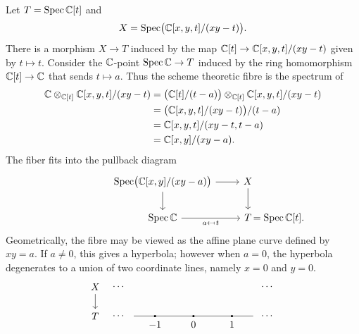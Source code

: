 \begin{example}
  Let $T = \operatorname{Spec} \mathbb{C}[t]$ and
  \[X = \operatorname{Spec}\bigl(\mathbb{C}[x, y, t]/(xy - t)\bigr).\] There is a morphism $X \to T$ induced by the map $\mathbb{C}[t] \to \mathbb{C}[x, y, t]/(xy - t)$ given by $t \mapsto t$. Consider the $\mathbb{C}$-point $\operatorname{Spec} \mathbb{C} \to T$ induced by the ring homomorphism $\mathbb{C}[t] \to \mathbb{C}$ that sends $t \mapsto a$. Thus the scheme theoretic fibre is the spectrum of
    \[
        \begin{aligned}
            \mathbb{C} \otimes_{\mathbb{C}[t]} \mathbb{C}[x, y, t]/(xy - t) 
            & = \bigl(\mathbb{C}[t]/(t - a)\bigr) \otimes_{\mathbb{C}[t]} \mathbb{C}[x, y, t]/(xy - t) \\
            & = \bigl(\mathbb{C}[x, y, t]/(xy - t)\bigr)/(t - a) \\
            & = \mathbb{C}[x, y, t]/(xy - t, t - a) \\
            & = \mathbb{C}[x, y]/(xy - a).
        \end{aligned}
    \]
    The fiber fits into the pullback diagram
    \[
        \begin{tikzcd}
            \Spec \bigl(\C[x,y]/(xy - a)\bigr) & X \\
            \Spec \C & T \rlap{$\,= \Spec \C[t]$.}
            \arrow[from=1-1, to=1-2]
            \arrow[from=1-1, to=2-1]
            \arrow[from=1-2, to=2-2]
            \arrow["{a \mapsfrom \, t}"', from=2-1, to=2-2]
        \end{tikzcd}
    \]
    Geometrically, the fibre may be viewed as the affine plane curve defined by $xy = a$. If $a \neq 0$, this gives a hyperbola; however when $a = 0$, the hyperbola degenerates to a union of two coordinate lines, namely $x = 0$ and $y = 0$. 
    \[
        \begin{tikzpicture}[scale=0.95]
            
            \def\ytop{0.55}
            \def\ybot{-0.55}
            
            \node at (-3.7,\ytop) {$X$};
            \node at (-3.7,\ybot) {$T$};
            \draw[->] (-3.7,0.28) -- (-3.7,-0.28);
            
            \node at (-2.8,\ytop) {$\cdots$};
            \node at ( 2.8,\ytop) {$\cdots$};
            \node at (-2.8,\ybot) {$\cdots$};
            \node at ( 2.8,\ybot) {$\cdots$};
            
            \draw (-2.25,\ybot) -- (2.25,\ybot);
            
            \foreach \x/\lab in {-1.45/{-1}, 0/{0}, 1.45/{1}} {
                \fill (\x,\ybot) circle (1.2pt);
                \node[below=2pt] at (\x,\ybot) {$\lab$};
            }
            

\end{tikzpicture}\]
\end{example}
